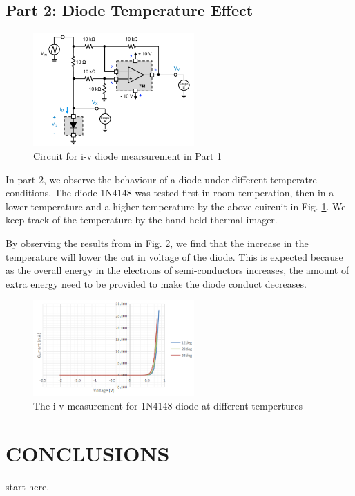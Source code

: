 \documentclass[letterpaper, 10 pt, conference]{ieeeconf}  %
\begin{document}
    \subsection{Part 2: Diode Temperature Effect}
	\begin{figure}[h]
        \centering
        \includegraphics[width=0.55\textwidth]{images/Part1circuit.png}
        \caption{Circuit for i-v diode mearsurement in Part 1}
		\label{fig:8}
    \end{figure}
    In part 2, we observe the behaviour of a diode under different temperatre conditions. The diode 1N4148 was tested first in room temperation, then in a lower temperature and a higher temperature by the above cuircuit in Fig. \ref{fig:8}. We keep track of the temperature by the hand-held thermal imager. 
\par By observing the results from in Fig. \ref{fig:9}, we find that the increase in the temperature will lower the cut in voltage of the diode. This is expected because as the overall energy in the electrons of semi-conductors increases, the amount of extra energy need to be provided to make the diode conduct decreases.\newline
\begin{figure}[h]
        \centering
        \includegraphics[width=0.55\textwidth]{images/result7.png}
        \caption{The i-v measurement for 1N4148 diode at different tempertures}
		\label{fig:9}
    \end{figure}


    \section{CONCLUSIONS}
    start here.
\end{document}
